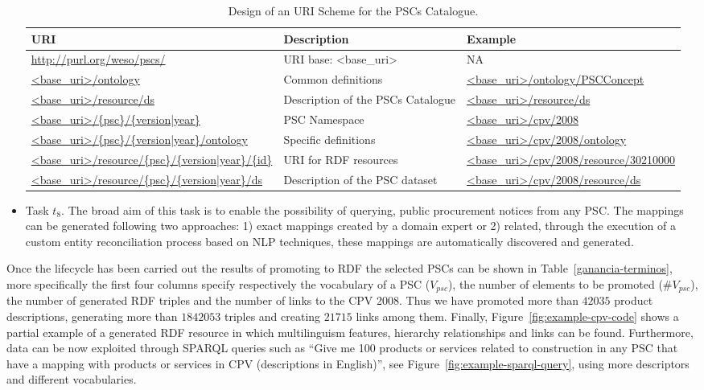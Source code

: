 \begin{itemize}
 \begin{table}[!ht]
\renewcommand{\arraystretch}{1.3}
\begin{center}
\begin{tabular}[c]{|p{5cm}|p{4.5cm}|p{5cm}|} 
\hline
  \textbf{URI} &  \textbf{Description} & \textbf{Example} \\\hline
  \url{http://purl.org/weso/pscs/} & URI base: <base\_uri> & NA \\ \hline
  \url{<base_uri>/ontology} & Common definitions & \url{<base_uri>/ontology/PSCConcept} \\ \hline
  \url{<base_uri>/resource/ds} & Description of the PSCs Catalogue & \url{<base_uri>/resource/ds} \\ \hline
  \url{<base_uri>/{psc}/{version|year}} & PSC Namespace & \url{<base_uri>/cpv/2008} \\ \hline
  \url{<base_uri>/{psc}/{version|year}/ontology} & Specific definitions & \url{<base_uri>/cpv/2008/ontology} \\ \hline
  \url{<base_uri>/resource/{psc}/{version|year}/{id}} & URI for RDF resources & \url{<base_uri>/cpv/2008/resource/30210000} \\ \hline
  \url{<base_uri>/resource/{psc}/{version|year}/ds} & Description of the PSC dataset  & \url{<base_uri>/cpv/2008/resource/ds} \\ \hline
\hline
\end{tabular}
\caption{Design of an URI Scheme for the PSCs Catalogue.}\label{table:pscs-uri}
  \end{center}
\end{table} 

\item Task $t_8$. The broad aim of this task is to enable the possibility of querying, 
public procurement notices from any PSC. The mappings can be generated following two approaches: 
1) exact mappings created by a domain expert or 2) related, through the execution of a custom entity reconciliation process 
based on NLP techniques, these mappings are automatically discovered and generated.
\end{itemize}






Once the lifecycle has been carried out the results of promoting to RDF the selected PSCs can be shown in Table~\ref{ganancia-terminos},
more specifically the first four columns specify respectively the vocabulary of a PSC ($V_{psc}$), the number of elements 
to be promoted (\#$V_{psc}$), the number of generated RDF triples and the number of links to the CPV 2008. 
Thus we have promoted more than $42035$ product descriptions, generating more than $1842053$ triples and creating $21715$ 
links among them. Finally, Figure~\ref{fig:example-cpv-code} shows a partial example of a generated RDF resource in which multilinguism features, 
hierarchy relationships and links can be found. Furthermore, data can be now exploited through SPARQL queries 
such as ``Give me 100 products or services related to construction in any PSC that have a mapping with products or 
services in CPV (descriptions in English)'', see Figure~\ref{fig:example-sparql-query}, using more descriptors and 
different vocabularies.

